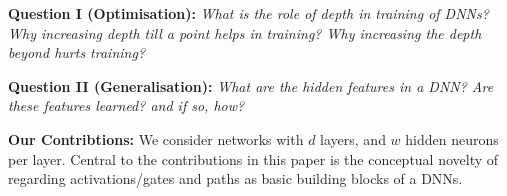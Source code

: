 \documentclass{article}
\begin{document}
\textbf{Question I (Optimisation):} \emph{What is the role of depth in training of DNNs? Why increasing depth till a point helps in training? Why increasing the depth beyond hurts training?}\\
\begin{comment}We call the above  questions are the depth phenomena. \cite{dudnn} show that, when it comes to training, residual networks are better than simple FC-DNNs. However, the depth phenomena in the case of simple FC-DNNs is still unresolved.
\end{comment}
\textbf{Question II (Generalisation):} \emph{What are the hidden features in a DNN? Are these features learned? and if so, how?}
\begin{comment}The general consensus is that, the DNNs learn hidden representations progressively in each of the intermediate layers, and the final layer learns a linear model using features obtained in the penultimate layer.  This view, while conceptually simple, however, does not provide us any analytical insight regarding the above question.  A more analytically appealing candidate for the hidden representation (used in some of the recent works \cite{}) is the \emph{neural tangent random feature} (NTRF) which is the NTF evaluated at randomised initialisation of an infinitely wide DNN. \cite{} provides generalisation bounds in terms of the Rademacher complexity of the class of functions defined by the NTRF and also in terms of an associated neural tangent kernel (NTK). \cite{} uses NTK to set a significant new benchmark for pure-kernel based learning.  An issue with the NTRF/NTK approach is that the features do not change over the training of the DNN, thus implying no feature learning is happening, and yet experimental evidence (in \cite{} as well as \Cref{sec:generalisation-exp}) shows that DNNs perform significantly better than pure-kernel learning with NTK.
\end{comment}

\textbf{Our Contribtions:}
We consider networks with $d$ layers, and $w$ hidden neurons per layer. Central to the contributions in this paper is the conceptual novelty of regarding activations/gates and paths as basic building blocks of a DNNs. %
\end{document}
